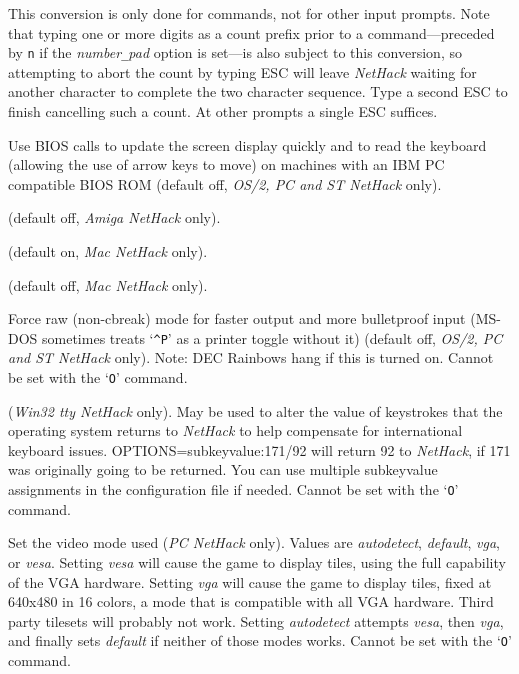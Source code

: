 This conversion is only done for commands, not for other input prompts.
Note that typing one or more digits as a count prefix prior to a
command---preceded by {\tt n} if the {\it number\verb+_+pad\/}
option is set---is
also subject to this conversion, so attempting to
abort the count by typing ESC will leave {\it NetHack\/} waiting for another
character to complete the two character sequence.
Type a second ESC to finish cancelling such a count.
At other prompts a single ESC suffices.
\item[\ib{BIOS}]
Use BIOS calls to update the screen display quickly and to read the keyboard
(allowing the use of arrow keys to move) on machines with an IBM PC
compatible BIOS ROM (default off, {\it OS/2, PC\/ {\rm and} ST NetHack\/} only).
\item[\ib{flush}]
(default off, {\it Amiga NetHack \/} only).
\item[\ib{Macgraphics}]
(default on, {\it Mac NetHack \/} only).
\item[\ib{page\verb+_+wait}]
(default off, {\it Mac NetHack \/} only).
\item[\ib{rawio}]
Force raw (non-cbreak) mode for faster output and more
bulletproof input (MS-DOS sometimes treats `{\tt \^{}P}' as a printer toggle
without it) (default off, {\it OS/2, PC\/ {\rm and} ST NetHack\/} only).
Note:  DEC Rainbows hang if this is turned on.
Cannot be set with the `{\tt O}' command.
\item[\ib{subkeyvalue}]
({\it Win32 tty NetHack \/} only).
May be used to alter the value of keystrokes that the operating system
returns to {\it NetHack\/} to help compensate for international keyboard
issues.
OPTIONS=subkeyvalue:171/92
will return 92 to {\it NetHack\/}, if 171 was originally going to be returned.
You can use multiple subkeyvalue assignments in the configuration file
if needed.
Cannot be set with the `{\tt O}' command.
\item[\ib{video}]
Set the video mode used ({\it PC\/ NetHack\/} only).
Values are {\it autodetect\/}, {\it default\/}, {\it vga\/}, or {\it vesa\/}.
Setting {\it vesa\/} will cause the game to display tiles, using the full
capability of the VGA hardware.
Setting {\it vga\/} will cause the game to display tiles, fixed at 640x480
in 16 colors, a mode that is compatible with all VGA hardware. Third party
tilesets will probably not work.
Setting {\it autodetect\/} attempts {\it vesa\/}, then {\it vga\/}, and
finally sets {\it default\/} if neither of those modes works.
Cannot be set with the `{\tt O}' command.
